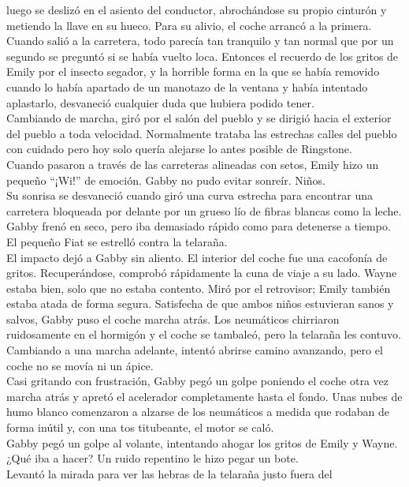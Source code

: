 luego se deslizó en el asiento del conductor, abrochándose su propio
cinturón y metiendo la llave en su hueco. Para su alivio, el coche
arrancó a la primera.\\
Cuando salió a la carretera, todo parecía tan tranquilo y tan normal que
por un segundo se preguntó si se había vuelto loca. Entonces el recuerdo
de los gritos de Emily por el insecto segador, y la horrible forma en la
que se había removido cuando lo había apartado de un manotazo de la
ventana y había intentado aplastarlo, desvaneció cualquier duda que
hubiera podido tener.\\
Cambiando de marcha, giró por el salón del pueblo y se dirigió hacia el
exterior del pueblo a toda velocidad. Normalmente trataba las estrechas
calles del pueblo con cuidado pero hoy solo quería alejarse lo antes
posible de Ringstone.\\
Cuando pasaron a través de las carreteras alineadas con setos, Emily
hizo un pequeño ``¡Wi!'' de emoción. Gabby no pudo evitar sonreír.
Niños.\\
Su sonrisa se desvaneció cuando giró una curva estrecha para encontrar
una carretera bloqueada por delante por un grueso lío de fibras blancas
como la leche. Gabby frenó en seco, pero iba demasiado rápido como para
detenerse a tiempo. El pequeño Fiat se estrelló contra la telaraña.\\
El impacto dejó a Gabby sin aliento. El interior del coche fue una
cacofonía de gritos. Recuperándose, comprobó rápidamente la cuna de
viaje a su lado. Wayne estaba bien, solo que no estaba contento. Miró
por el retrovisor; Emily también estaba atada de forma segura.
Satisfecha de que ambos niños estuvieran sanos y salvos, Gabby puso el
coche marcha atrás. Los neumáticos chirriaron ruidosamente en el
hormigón y el coche se tambaleó, pero la telaraña les contuvo. Cambiando
a una marcha adelante, intentó abrirse camino avanzando, pero el coche
no se movía ni un ápice.\\
Casi gritando con frustración, Gabby pegó un golpe poniendo el coche
otra vez marcha atrás y apretó el acelerador completamente hasta el
fondo. Unas nubes de humo blanco comenzaron a alzarse de los neumáticos
a medida que rodaban de forma inútil y, con una tos titubeante, el motor
se caló.\\
Gabby pegó un golpe al volante, intentando ahogar los gritos de Emily y
Wayne. ¿Qué iba a hacer? Un ruido repentino le hizo pegar un bote.\\
Levantó la mirada para ver las hebras de la telaraña justo fuera del
